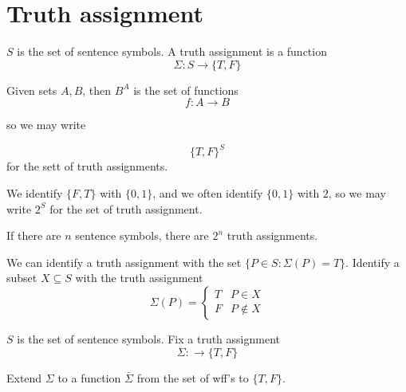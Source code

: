 \documentclass[11pt]{article}
\begin{document}
	\section{Truth assignment}
	$S$ is the set of sentence symbols. A truth assignment is a function
	\[\Sigma : S \rightarrow \{T, F\} \]
	
	Given sets $A, B$, then $B^A$ is the set of functions
	\[f : A \rightarrow B\]
	
	so we may write 
	
	\[\{T, F\}^S\] for the sett of truth assignments.
	
	We identify $\{F, T\}$ with $\{0, 1\}$, and we often identify $\{0, 1\}$ with $2$, so we may write $2^S$ for the set of truth assignment.
	
	If there are $n$ sentence symbols, there are $2^n$ truth assignments.
	
	We can identify a truth assignment with the set $\{P \in S : \Sigma(P) = T\}$. Identify a subset $X \subseteq S$ with the truth assignment
	\[\Sigma(P) = 
	\begin{cases}
		T & P \in X\\
		F & P \notin X
	\end{cases} \]
	
	$S$ is the set of sentence symbols. Fix a truth assignment 
	\[\Sigma: \rightarrow \{T, F\}\]
	
	Extend $\Sigma$ to a function $\bar{\Sigma}$ from the set of wff's to $\{T, F\}$.
\end{document}
